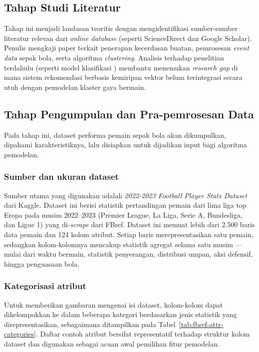 \subsection{Tahap Studi Literatur}
\label{subsec:literatur}

Tahap ini menjadi landasan teoritis dengan mengidentifikasi sumber-sumber literatur relevan dari \emph{online database} (seperti ScienceDirect dan Google Scholar). Penulis mengkaji paper terkait penerapan kecerdasan buatan, pemrosesan \emph{event data} sepak bola, serta algoritma \emph{clustering}. Analisis terhadap penelitian terdahulu (seperti model klasifikasi \textcite{shen2026}) membantu menemukan \emph{research gap} di mana sistem rekomendasi berbasis kemiripan vektor belum terintegrasi secara utuh dengan pemodelan klaster gaya bermain.

\subsection{Tahap Pengumpulan dan Pra-pemrosesan Data}
\label{subsec:pra-pemrosesan}

Pada tahap ini, dataset performa pemain sepak bola akan dikumpulkan, dipahami karakteristiknya, lalu disiapkan untuk dijadikan input bagi algoritma pemodelan.

\subsubsection{Sumber dan ukuran dataset}

Sumber utama yang digunakan adalah \emph{2022-2023 Football Player Stats Dataset} dari Kaggle. Dataset ini berisi statistik pertandingan pemain dari lima liga top Eropa pada musim 2022--2023 (Premier League, La Liga, Serie A, Bundesliga, dan Ligue 1) yang di-\emph{scrape} dari FBref. Dataset ini memuat lebih dari 2.500 baris data pemain dan 124 kolom atribut. Setiap baris merepresentasikan satu pemain, sedangkan kolom-kolomnya mencakup statistik agregat selama satu musim --- mulai dari waktu bermain, statistik penyerangan, distribusi umpan, aksi defensif, hingga penguasaan bola.

\subsubsection{Kategorisasi atribut}

Untuk memberikan gambaran mengenai isi dataset, kolom-kolom dapat dikelompokkan ke dalam beberapa kategori berdasarkan jenis statistik yang direpresentasikan, sebagaimana ditampilkan pada Tabel~\ref{tab:fbref-attr-categories}. Daftar contoh atribut bersifat representatif terhadap struktur kolom dataset dan digunakan sebagai acuan awal pemilihan fitur pemodelan.

